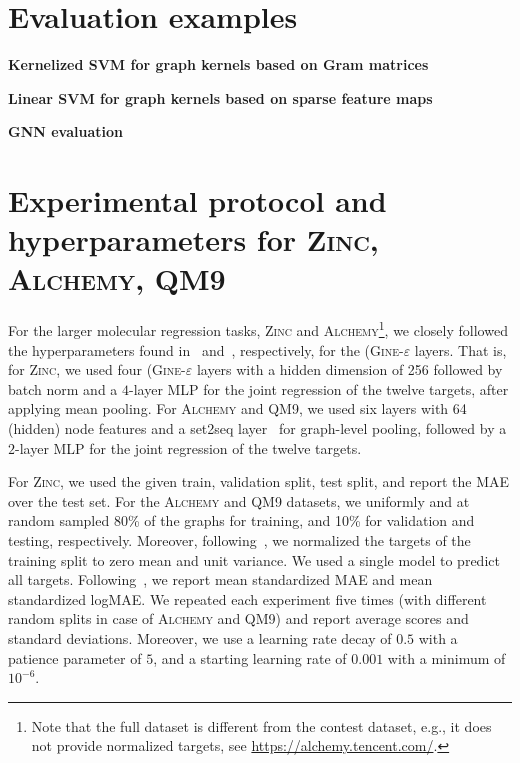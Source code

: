 \documentclass{article}
\newcommand{\xhdr}[1]{{\noindent\bfseries #1}}
\theoremstyle{definition}
\begin{document}



\appendix

\onecolumn



\section{Evaluation examples}

\xhdr{Kernelized SVM for graph kernels based on Gram matrices}


\xhdr{Linear SVM for graph kernels based on sparse feature maps}


\xhdr{GNN evaluation}


\section{Experimental protocol and hyperparameters for \textsc{Zinc}, \textsc{Alchemy}, \textsc{QM9}}\label{eval}
For the larger molecular regression tasks, \textsc{Zinc} and \textsc{Alchemy}\footnote{Note that the full dataset is different from the contest dataset, e.g., it does not provide normalized targets, see \url{https://alchemy.tencent.com/}.}, we closely followed the hyperparameters found in~\cite{Dwi+2020} and~\cite{Che+2020}, respectively, for the (\textsc{Gine-$\varepsilon$} layers. That is, for \textsc{Zinc}, we used four (\textsc{Gine-$\varepsilon$} layers with a hidden dimension of 256 followed by batch norm and a $4$-layer MLP for the joint regression of the twelve targets, after applying mean pooling. For \textsc{Alchemy} and \textsc{QM9}, we used six layers with 64 (hidden) node features and a set2seq layer~\cite{Vin+2016} for graph-level pooling, followed by a $2$-layer MLP for the joint regression of the twelve targets.

For \textsc{Zinc}, we used the given train, validation split, test split, and report the MAE over the test set. For the \textsc{Alchemy} and \textsc{QM9} datasets, we uniformly and at random sampled 80\% of the graphs for training, and 10\% for validation and testing, respectively. Moreover, following~\cite{Che+2020,Gil+2017}, we normalized the targets of the training split to zero mean and unit variance. We used a single model to predict all targets. Following~\cite{Kli+2020}, we report mean standardized MAE and mean standardized logMAE. We repeated each experiment five times (with different random splits in case of \textsc{Alchemy} and \textsc{QM9}) and report average scores and standard deviations.  Moreover, we use a learning rate decay of $0.5$ with a patience parameter of $5$, and a starting learning rate of $0.001$ with a minimum of $10^{-6}$.
\end{document}
